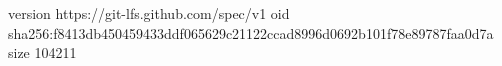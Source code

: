 version https://git-lfs.github.com/spec/v1
oid sha256:f8413db450459433ddf065629c21122ccad8996d0692b101f78e89787faa0d7a
size 104211
